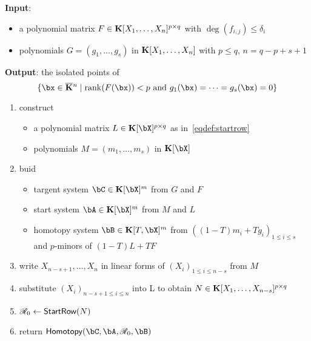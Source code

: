 \documentclass[12pt]{article}
\begin{document}
\begin{algorithm}
\caption{$\mathsf{Row-degree Homotopy}$}
{\bf Input}:\begin{itemize}
\item a polynomial matrix $F \in \mathbf{K}[X_1, \ldots, X_n]^{p \times q}$ with $\deg(f_{i,j}) \leq \delta_i$
\item polynomials $G = (g_1, \ldots, g_s)$ in $\mathbf{K}[X_1, \ldots, X_n]$ with $p \leq q$, $n = q-p+s+1$
\end{itemize}
{\bf Output}: the isolated points of
$$\{\bx \in \KKbar{}^n \mid  \mathrm{rank}(\mF({\bx})) < p
\text{~and~} g_1(\bx)=\cdots=g_s(\bx)=0\}$$
\begin{enumerate}
\item construct \begin{itemize}
\item a polynomial matrix $L \in \KK[\bX]^{p \times q}$ as in~\ref{eqdef:startrow}
\item polynomials $M = (m_1, \ldots, m_s)$ in $\KK[\bX]$
\end{itemize}
\item buid 
\begin{itemize}
\item targent system $\bC \in \KK[\bX]^{m}$ from $G$ and $F$
\item start system $\bA \in \KK[\bX]^{m}$ from $M$ and $L$
\item homotopy system $\bB \in \KK[T,\bX]^{m}$ from $((1-T)m_i + Tg_i)_{1 \leq i \leq s}$ and $p$-minors of $(1-T)L + TF$
\end{itemize}
\item write $X_{n-s+1}, \ldots, X_n$ in linear forms of $(X_i)_{1\leq i \leq n-s}$ from $M$
\item substitute $(X_i)_{n-s+1 \leq i \leq n}$ into L to obtain $N\in \mathbf{K}[X_1, \ldots, X_{n-s}]^{p \times q}$
\item $\mathscr{R}_0 \gets \mathsf{StartRow}(N)$
\item return $\mathsf{Homotopy}(\bC,\bA,\scrR_0,\bB)$
\end{enumerate}
\label{Row}
\end{algorithm}
\newpage
 
\end{document}
